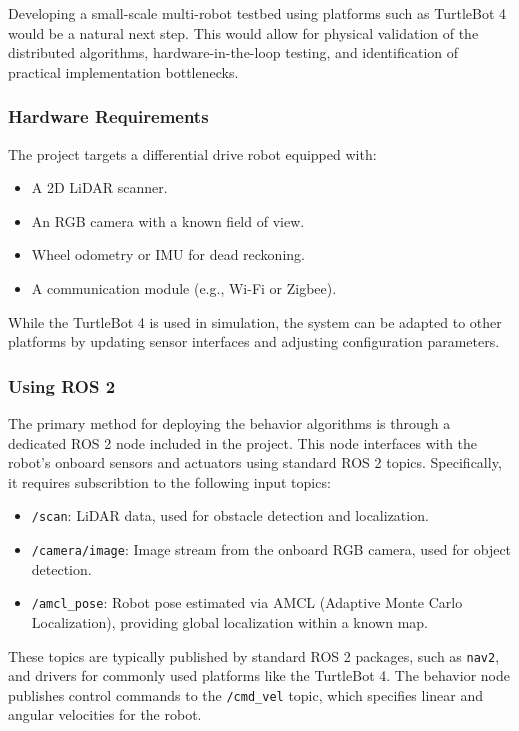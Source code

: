Developing a small-scale multi-robot testbed using platforms such as TurtleBot 4 would be a natural next step. This would allow for physical validation of the distributed algorithms, hardware-in-the-loop testing, and identification of practical implementation bottlenecks.

\subsubsection{Hardware Requirements}
The project targets a differential drive robot equipped with:
\begin{itemize}
  \item A 2D LiDAR scanner.
  \item An RGB camera with a known field of view.
  \item Wheel odometry or IMU for dead reckoning.
  \item A communication module (e.g., Wi-Fi or Zigbee).
\end{itemize}

While the TurtleBot 4 is used in simulation, the system can be adapted to other platforms by updating sensor interfaces and adjusting configuration parameters.

\subsubsection{Using ROS 2}
The primary method for deploying the behavior algorithms is through a dedicated ROS 2 node included in the project. 
This node interfaces with the robot’s onboard sensors and actuators using standard ROS 2 topics. 
Specifically, it requires subscribtion to the following input topics:

\begin{itemize}
  \item \texttt{/scan}: LiDAR data, used for obstacle detection and localization.
  \item \texttt{/camera/image}: Image stream from the onboard RGB camera, used for object detection.
  \item \texttt{/amcl\_pose}: Robot pose estimated via AMCL (Adaptive Monte Carlo Localization), providing global localization within a known map.
\end{itemize}

These topics are typically published by standard ROS 2 packages, such as \texttt{nav2}, and drivers for commonly used platforms like the TurtleBot 4. 
The behavior node publishes control commands to the \texttt{/cmd\_vel} topic, which specifies linear and angular velocities for the robot.

